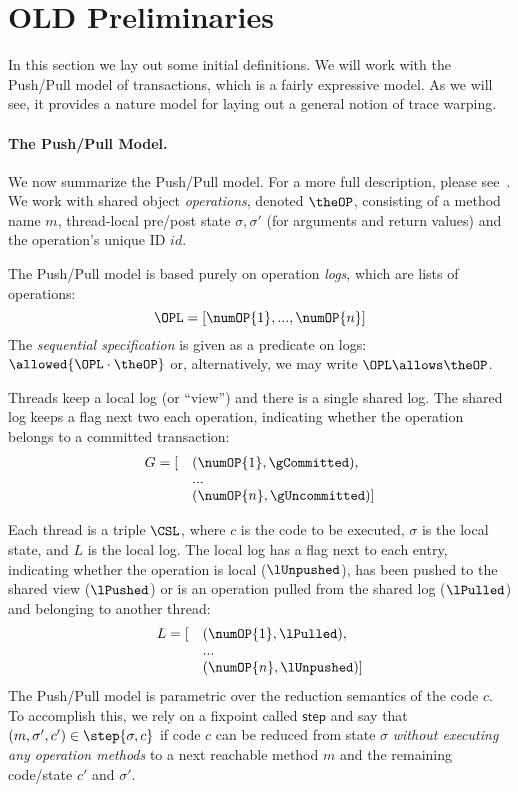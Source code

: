 \section{OLD Preliminaries}

In this section we lay out some initial definitions. We will work with
the Push/Pull model of transactions, which is a fairly expressive model.
As we will see, it provides a nature model for laying
out a general notion of trace warping.

\paragraph{The Push/Pull Model.} We now summarize the Push/Pull
model. For a more full description, please see~\cite{pmpy}.
%
We work with shared object \emph{operations}, denoted $\theOP$,
consisting of a method name $m$, thread-local pre/post state $\sigma,
\sigma'$ (for arguments and return values)
and the operation's unique ID $id$.

The Push/Pull model is based purely on operation \emph{logs}, which
are lists of operations:
\[
  \OPL = [ \numOP{1},  ..., \numOP{n}]
\]
The \emph{sequential specification}  is given as a predicate on logs:
$\allowed{\OPL\cdot \theOP}$ or, alternatively, we may write 
$\OPL \allows \theOP$.

Threads keep a local log (or ``view'') and there is a single shared
log. The shared log keeps a flag next two each operation, indicating
whether the operation belongs to a committed transaction:
%
\[\begin{array}{rl}
  G = [ &(\numOP{1},\gCommitted),  \\
   &...\\
                &(\numOP{n},\gUncommitted)]
\end{array} \]

Each thread is a triple $\CSL$, where $c$ is the code to be executed,
$\sigma$ is the local state, and $L$ is the local log. The local log has a
flag next to each entry, indicating whether the operation is local
($\lUnpushed$), has been {\sc push}ed to the shared view ($\lPushed$) or
is an operation {\sc pull}ed from the shared log ($\lPulled$) and
belonging to another thread:
\[\begin{array}{rl}
  L = [ &(\numOP{1},\lPulled),  \\
   &...\\
                &(\numOP{n},\lUnpushed)]
\end{array} \]
%
The Push/Pull model is parametric over the reduction semantics of the
code $c$. To accomplish this, we rely on a fixpoint called $\textsf{step}$
and say that 
 $(m,\sigma',c') \in \step{\sigma,c}$
if code $c$ can be reduced from state $\sigma$ 
\emph{without executing any operation methods} to a next reachable
method $m$ and the remaining code/state $c'$ and $\sigma'$.

